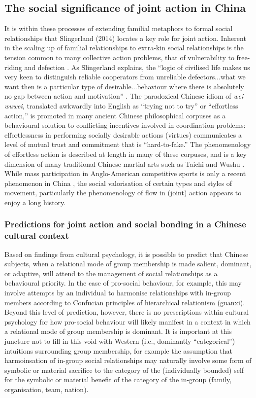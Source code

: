 {  \subsection{The social significance of joint action in China}
  It is within these processes of extending familial metaphors to formal social relationships that Slingerland (2014) locates a key role for joint action. Inherent in the scaling up of familial relationships to extra-kin social relationships is the tension common to many collective action problems, that of vulnerability to free-riding and defection \citep{Cosmides2013,Gavrilets2015}.
  As Slingerland explains, the ``logic of civilised life makes us very keen to distinguish reliable cooperators from unreliable defectors...what we want then is a particular type of desirable...behaviour where there is absolutely no gap between action and motivation'' \citep[192]{Slingerland2014}. The paradoxical Chinese idiom of \textit{wei wuwei}, translated awkwardly into English as ``trying not to try'' or ``effortless action,'' is promoted in many ancient Chinese philosophical corpuses as a behavioural solution to conflicting incentives involved in coordination problems: effortlessness in performing socially desirable actions (virtues) communicates a level of mutual trust and commitment that is ``hard-to-fake.''  The phenomenology of effortless action is described at length in many of these corpuses, and is a key dimension of many traditional Chinese martial arts such as Taichi and Wushu \citep{Morris1998}.
  While mass participation in Anglo-American competitive sports is only a recent phenomenon in China \citep{Brownell2008}, the social valorisation of certain types and styles of movement, particularly the phenomenology of flow in (joint) action appears to enjoy a long history.


  \subsubsection{Predictions for joint action and social bonding in a Chinese cultural context}




  Based on findings from cultural psychology, it is possible to predict that Chinese subjects, when a relational mode of group membership is made salient, dominant, or adaptive, will attend to the management of social relationships as a behavioural priority.  In the case of pro-social behaviour, for example, this may involve attempts by an individual to harmonise relationships with in-group members according to Confucian principles of hierarchical relationism (guanxi).  Beyond this level of prediction, however, there is no prescriptions within cultural psychology for how pro-social behaviour will likely manifest in a context in which a relational mode of group membership is dominant.  It is important at this juncture not to fill in this void with Western (i.e., dominantly ``categorical'') intuitions surrounding group membership, for example the assumption that harmoinsation of in-group social relationships may naturally involve some form of symbolic or material sacrifice to the category of the (individually bounded) self for the symbolic or material benefit of the category of the in-group (family, organisation, team, nation).

}
